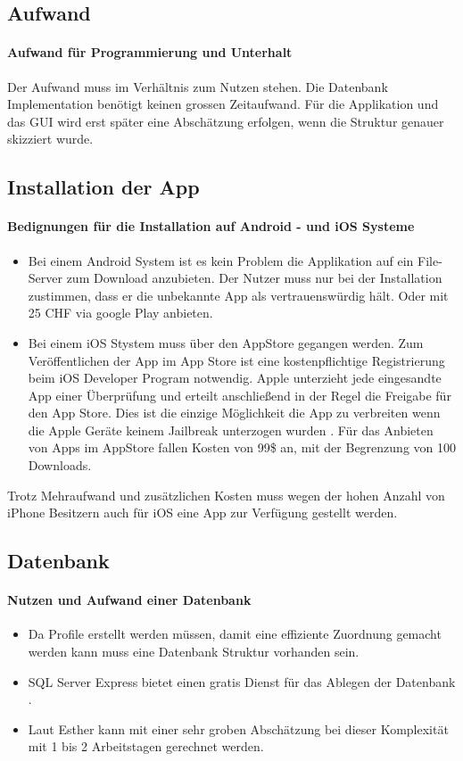 \subsection{Aufwand}
\paragraph{Aufwand für Programmierung und Unterhalt} Der Aufwand muss im Verhältnis zum Nutzen stehen. Die Datenbank Implementation benötigt keinen grossen Zeitaufwand. Für die Applikation und das GUI wird erst später eine Abschätzung erfolgen, wenn die Struktur genauer skizziert wurde.

\subsection{Installation der App}
\paragraph{Bedignungen für die Installation auf Android - und iOS Systeme}
\begin{itemize}
\item Bei einem Android System ist es kein Problem die Applikation auf ein File-Server zum Download anzubieten. Der Nutzer muss nur bei der Installation zustimmen, dass er die unbekannte App als vertrauenswürdig hält. Oder mit 25 CHF via google Play anbieten.
\item Bei einem iOS Stystem muss über den AppStore gegangen werden.  Zum Veröffentlichen der App im App Store ist eine kostenpflichtige Registrierung beim iOS Developer Program notwendig. Apple unterzieht jede eingesandte App einer Überprüfung und erteilt anschließend in der Regel die Freigabe für den App Store. Dies ist die einzige Möglichkeit die App zu verbreiten wenn die Apple Geräte keinem Jailbreak unterzogen wurden \cite{appStore}. Für das Anbieten von Apps im AppStore fallen Kosten von 99\$ an, mit der Begrenzung von 100 Downloads.
\end{itemize}
Trotz Mehraufwand und zusätzlichen Kosten muss wegen der hohen Anzahl von iPhone Besitzern auch für iOS eine App zur Verfügung gestellt werden.

\subsection{Datenbank}
\paragraph{Nutzen und Aufwand einer Datenbank}\begin{itemize}
\item Da Profile erstellt werden müssen, damit eine effiziente Zuordnung gemacht werden kann muss eine Datenbank Struktur vorhanden sein.
\item SQL Server Express bietet einen gratis Dienst für das Ablegen der Datenbank \cite{SQL}.
\item Laut Esther kann mit einer sehr groben Abschätzung bei dieser Komplexität mit 1 bis 2 Arbeitstagen gerechnet werden.
\end{itemize}

